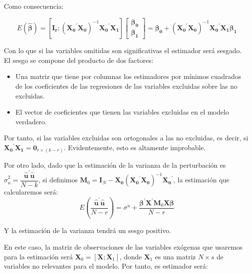 Como consecuencia:

\[E(\hat{\boldsymbol{\beta}})=\left[\boldsymbol{I_r};\left(\boldsymbol{X_0}^{\prime}\boldsymbol{X_0}\right)^{-1}\boldsymbol{X_0}^{\prime}\boldsymbol{X_1}\right]\left[\begin{matrix}
\boldsymbol{\beta_0} \\
\boldsymbol{\beta_1}
\end{matrix}\right]=\boldsymbol{\beta_0}+\left(\boldsymbol{X_0}^{\prime}\boldsymbol{X_0}\right)^{-1}\boldsymbol{X_0}^{\prime}\boldsymbol{X_1}\boldsymbol{\beta_1}\]

Con lo que si las variables omitidas son significativas el estimador ser\'a sesgado. El sesgo se compone del producto de dos factores:
\begin{itemize}
\item Una matriz que tiene por columnas los estimadores por m\'inimos cuadrados de los coeficientes de las regresiones de las variables excluidas sobre las no excluidas.
\item El vector de coeficientes que tienen las variables excluidas en el modelo verdadero. 
\end{itemize}

Por tanto, si las variables excluidas son ortogonales a las no excluidas, es decir, si $\boldsymbol{X_0}^{\prime}\boldsymbol{X_1}=\boldsymbol{0}_{r\times(k-r)}$. Evidentemente, esto es altamente improbable.

Por otro lado, dado que la estimaci\'on de la varianza de la perturbaci\'on es $\hat{\sigma}^2_u=\dfrac{\hat{\boldsymbol{u}}^{\prime}\hat{\boldsymbol{u}}}{N-k}$, si definimos $\boldsymbol{M}_0=\boldsymbol{I}_N-\boldsymbol{X_0}(\boldsymbol{X_0}^{\prime}\boldsymbol{X_0})^{-1}\boldsymbol{X_0}^{\prime}$, la estimaci\'on que calcularemos ser\'a:
\[E(\dfrac{\hat{\boldsymbol{u}}^{\prime}\hat{\boldsymbol{u}}}{N-r})=\sigma^u+\dfrac{\boldsymbol{\beta}^{\prime}\boldsymbol{X}^{\prime}\boldsymbol{M}_0\boldsymbol{X}\boldsymbol{\beta}}{N-r}\]

Y la estimaci\'on de la varianza tendr\'a un sesgo positivo.


En este caso, la matriz de observaciones de las variables ex\'ogenas que usaremos para la estimaci\'on ser\'a $\boldsymbol{X}_0=\left[\boldsymbol{X};\boldsymbol{X}_1\right]$, donde $\boldsymbol{X}_1$ es una matriz $N\times s$ de variables no relevantes para el modelo. Por tanto, es estimador ser\'a:

